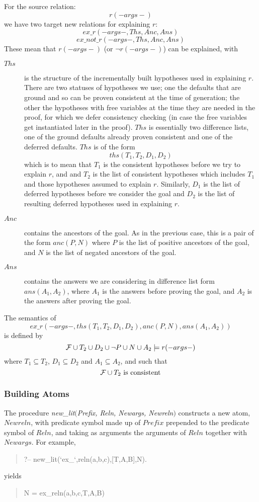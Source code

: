 For the source relation:
\[r( - args -)\]
we have two target new relations for explaining $r$:
\[ex\_r( - args - , Ths, Anc, Ans)\]
\[ex\_not\_r( - args - , Ths, Anc, Ans)\]
These mean that $r(-args-)$ (or $\neg r(-args-)$) can be explained, with
\begin{description}
\item[$Ths$] is the structure of the incrementally built hypotheses
used in explaining $r$. There are two statuses of hypotheses we
use; one the defaults that are ground and so can be proven
consistent at the time of generation;
the other the hypotheses with free variables at the time they
are needed in the proof, for which we defer consistency
checking (in case the free variables get instantiated later in the proof).
$Ths$ is essentially
two difference lists, one of the ground defaults already
proven consistent and one of the
deferred defaults. $Ths$ is of the form
\[ths(T_1,T_2,D_1,D_2)\]
which is to mean that $T_1$ is the consistent hypotheses before
we try to explain $r$, and
and $T_2$ is the list of consistent hypotheses which includes
$T_1$ and those hypotheses assumed to explain $r$.
Similarly, $D_1$ is the list of deferred hypotheses before we consider the goal
and $D_2$ is the list of resulting deferred hypotheses used in explaining $r$.

\item[$Anc$] contains the ancestors of the goal. As in the previous case,
this is a pair of the form
$anc(P,N)$ where $P$ is the list of positive ancestors of the goal,
and $N$ is the list of negated ancestors of the goal.

\item[$Ans$] contains the answers we are considering in difference list form
$ans(A_1,A_2)$, where $A_1$ is the answers before
proving the goal, and $A_2$ is the answers after proving the goal.
\end{description}

The semantics of
\[ex\_r(-args-,ths(T_1,T_2,D_1,D_2),anc(P,N),ans(A_1,A_2))\]
is defined by
\[{\cal F}\cup T_2 \cup D_2 \cup \neg P \cup N \cup A_2 \models r(-args-) \]
where $T_1\subseteq T_2$, $D_1\subseteq D_2$ and $A_1\subseteq A_2$, and
such that
\[{\cal F}\cup T_2 \hbox{ is consistent}\]

\subsubsection{Building Atoms}
The procedure {\em new\_lit$($Prefix, Reln, Newargs, Newreln\/}$)$ constructs
a new atom, $Newreln$, with predicate symbol made up of
$Prefix$ prepended to the
predicate symbol of $Reln$, and taking as arguments the arguments of $Reln$
together with $Newargs$.
For example,
\begin{quote}
?-- new\_lit(`ex\_`,reln(a,b,c),[T,A,B],N).
\end{quote}
yields
\begin{quote}
N = ex\_reln(a,b,c,T,A,B)
\end{quote}

